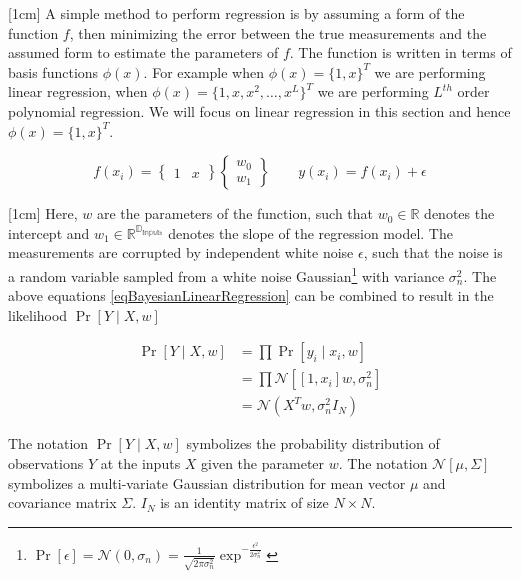 [1cm]
A simple method to perform regression is by assuming a form of the function $f$, then minimizing the error between the true measurements and the assumed form to estimate the parameters of $f$. The function is written in terms of basis functions $\phi(x)$. For example when $\phi(x) = \{1, x\}^{T}$ we are performing linear regression, when $\phi(x) = \{1, x, x^{2}, \ldots, x^{L}\}^{T}$ we are performing $L^{th}$ order polynomial regression. We will focus on linear regression in this section and hence $\phi(x) = \{1, x\}^{T}$.

\begin{equation}\label{eqBayesianLinearRegression}
f(x_{i}) = \begin{Bmatrix}
1 & x
\end{Bmatrix}  \begin{Bmatrix}
w_{0}\\ 
w_{1}
\end{Bmatrix}
\quad \quad y(x_{i}) = f(x_{i}) + \epsilon
\end{equation}

[1cm]
Here, $w$ are the parameters of the function, such that $w_{0} \in \mathbb{R}$ denotes the intercept and $w_{1} \in \mathbb{R^{D_{inputs}}}$ denotes the slope of the regression model. The measurements are corrupted by independent white noise $\epsilon$, such that the noise is a random variable sampled from a white noise Gaussian\footnote{$\Pr[\epsilon] = \mathcal{N}(0, \sigma_{n}) = \frac{1}{\sqrt{2\pi\sigma_{n}^{2}}}\exp^{-\frac{\epsilon^{2}}{2\sigma_{n}^{2}}}
$} with variance $\sigma_{n}^{2}$. The above equations \ref{eqBayesianLinearRegression} can be combined to result in the likelihood $\Pr[Y\mid X, w]$

\begin{equation}\label{eqBayesianLikelihood}
\begin{aligned}
\Pr[Y \mid X, w]  & = \prod \Pr[y_{i}\mid x_{i}, w]\\
                & = \prod \mathcal{N}[[1, x_{i}]w , \sigma_{n}^{2}]\\
                & = \mathcal{N}(X^{T} w, \sigma_{n}^{2}I_N)    
\end{aligned}
\end{equation}

The notation $\Pr[Y \mid X, w]$ symbolizes the probability distribution of observations $Y$ at the inputs $X$ given the parameter $w$. The notation $\mathcal{N}[\mu , \Sigma]$ symbolizes a multi-variate Gaussian distribution for mean vector $\mu$ and covariance matrix $\Sigma$. $I_N$ is an identity matrix of size $N \times N$.

